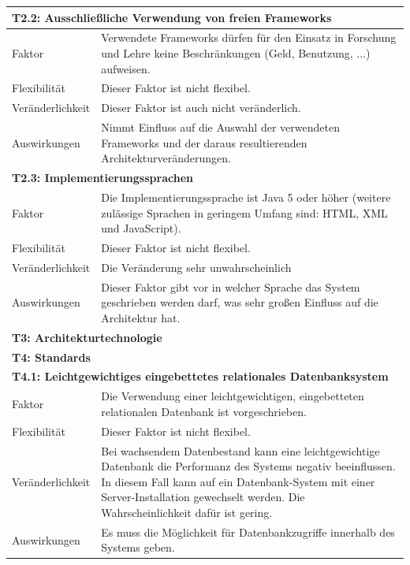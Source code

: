 \documentclass[fontsize=12pt,paper=a4,twoside]{scrartcl}
\begin{document}
\begin{tabularx}{\textwidth}{|l|X|}
\hline
\multicolumn{2}{|l|}{\textbf{T2.2: Ausschließliche Verwendung von freien Frameworks}}\\\hline
Faktor & Verwendete Frameworks dürfen für den Einsatz in Forschung und Lehre keine Beschränkungen (Geld, Benutzung, ...) aufweisen. \\\hline
 Flexibilität & Dieser Faktor ist nicht flexibel. \\\hline
 Veränderlichkeit & Dieser Faktor ist auch nicht veränderlich.\\\hline
 Auswirkungen & Nimmt Einfluss auf die Auswahl der verwendeten Frameworks und der daraus resultierenden Architekturveränderungen.\\\hline
\multicolumn{2}{|l|}{\textbf{T2.3: Implementierungssprachen}}\\\hline
Faktor & Die Implementierungssprache ist Java 5 oder höher (weitere zulässige Sprachen in geringem Umfang sind: HTML, XML und JavaScript). \\\hline
 Flexibilität & Dieser Faktor ist nicht flexibel. \\\hline
 Veränderlichkeit & Die Veränderung sehr unwahrscheinlich \\\hline
 Auswirkungen & Dieser Faktor gibt vor in welcher Sprache das System geschrieben werden darf, was sehr großen Einfluss auf die Architektur hat.\\\hline
\multicolumn{2}{|l|}{\textbf{T3: Architekturtechnologie}}\\\hline
\multicolumn{2}{|l|}{\textbf{T4: Standards}}\\\hline
\multicolumn{2}{|l|}{\textbf{T4.1: Leichtgewichtiges eingebettetes relationales Datenbanksystem}}\\\hline
Faktor & Die Verwendung einer leichtgewichtigen, eingebetteten relationalen Datenbank ist vorgeschrieben. \\\hline
 Flexibilität & Dieser Faktor ist nicht flexibel. \\\hline
 Veränderlichkeit & Bei wachsendem Datenbestand kann eine leichtgewichtige Datenbank die Performanz des Systems negativ beeinflussen. In diesem Fall kann auf ein Datenbank-System mit  einer Server-Installation gewechselt werden. Die Wahrscheinlichkeit dafür ist gering. \\\hline
 Auswirkungen & Es muss die Möglichkeit für Datenbankzugriffe innerhalb des Systems geben. \\\hline
\end{tabularx}
\newpage
\end{document}
